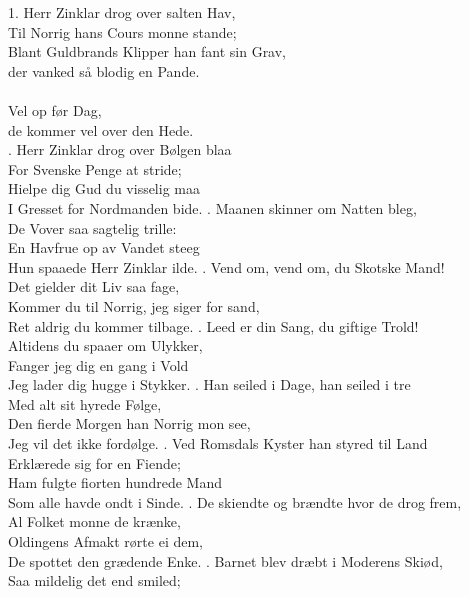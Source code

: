 1. Herr Zinklar drog over salten Hav, \\
Til Norrig hans Cours monne stande;\\
Blant Guldbrands Klipper han fant sin Grav,\\
der vanked så blodig en Pande.\\
\hops
{} {}\\ 
 Vel op før Dag, \tab{}\\
 de kommer vel over den Hede.\\
. Herr Zinklar drog over Bølgen blaa  \\
For Svenske Penge at stride; \tab{}\\
Hielpe dig Gud du visselig maa \\
I Gresset for Nordmanden bide. 
. Maanen skinner om Natten bleg,\\
De Vover saa sagtelig trille:\\
En Havfrue op av Vandet steeg\\
Hun spaaede Herr Zinklar ilde.
. Vend om, vend om, du Skotske Mand!\\
Det gielder dit Liv saa fage,\\
Kommer du til Norrig, jeg siger for sand,\\
Ret aldrig du kommer tilbage.
. Leed er din Sang, du giftige Trold!\\
Altidens du spaaer om Ulykker,\\
Fanger jeg dig en gang i Vold\\
Jeg lader dig hugge i Stykker.
. Han seiled i Dage, han seiled i tre\\
Med alt sit hyrede Følge,\\
Den fierde Morgen han Norrig mon see,\\
Jeg vil det ikke fordølge.
. Ved Romsdals Kyster han styred til Land\\
Erklærede sig for en Fiende;\\
Ham fulgte fiorten hundrede Mand\\
Som alle havde ondt i Sinde.
. De skiendte og brændte hvor de drog frem,\\
Al Folket monne de krænke,\\
Oldingens Afmakt rørte ei dem,\\
De spottet den grædende Enke.
. Barnet blev dræbt i Moderens Skiød,\\
Saa mildelig det end smiled;\\
